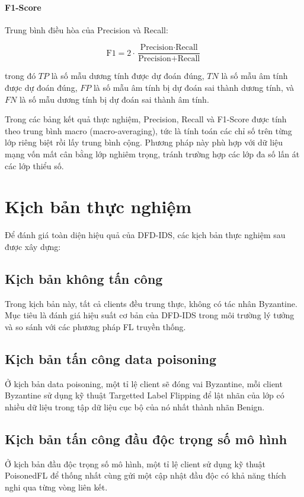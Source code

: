 \paragraph{F1-Score} Trung bình điều hòa của Precision và Recall:

\begin{equation}
\label{eq:f1}
\text{F1} = 2 \cdot \frac{\text{Precision} \cdot \text{Recall}}{\text{Precision} + \text{Recall}}
\end{equation}

trong đó $TP$ là số mẫu dương tính được dự đoán đúng, $TN$ là số mẫu âm tính được dự đoán đúng, $FP$ là số mẫu âm tính bị dự đoán sai thành dương tính, và $FN$ là số mẫu dương tính bị dự đoán sai thành âm tính.

Trong các bảng kết quả thực nghiệm, Precision, Recall và F1-Score được tính theo trung bình macro (macro-averaging), tức là tính toán các chỉ số trên từng lớp riêng biệt rồi lấy trung bình cộng. Phương pháp này phù hợp với dữ liệu mạng vốn mất cân bằng lớp nghiêm trọng, tránh trường hợp các lớp đa số lấn át các lớp thiểu số.

\section{Kịch bản thực nghiệm}
\label{sec:scenarios}
Để đánh giá toàn diện hiệu quả của DFD-IDS, các kịch bản thực nghiệm sau được xây dựng:

\subsection{Kịch bản không tấn công}
Trong kịch bản này, tất cả clients đều trung thực, không có tác nhân Byzantine. Mục tiêu là đánh giá hiệu suất cơ bản của DFD-IDS trong môi trường lý tưởng và so sánh với các phương pháp FL truyền thống.

\subsection{Kịch bản tấn công data poisoning}
Ở kịch bản data poisoning, một tỉ lệ client sẽ đóng vai Byzantine, mỗi client Byzantine sử dụng kỹ thuật Targetted Label Flipping \cite{tolpegin2020targetedflip} để lật nhãn của lớp có nhiều dữ liệu trong tập dữ liệu cục bộ của nó nhất thành nhãn Benign.

\subsection{Kịch bản tấn công đầu độc trọng số mô hình}
Ở kịch bản đầu độc trọng số mô hình, một tỉ lệ client sử dụng kỹ thuật PoisonedFL \cite{xie2025poisonedfl} để thống nhất cùng gửi một cập nhật đầu độc có khả năng thích nghi qua từng vòng liên kết.

